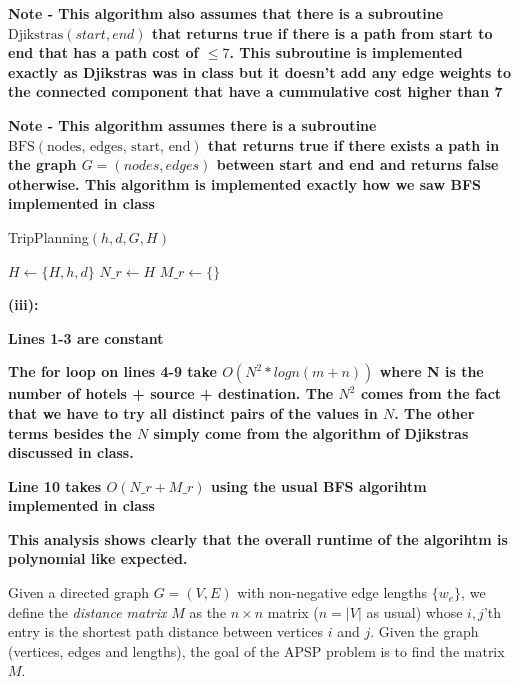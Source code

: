 \documentclass[addpoints]{exam}
\def\mysolution#1{}    %
\begin{document}
\begin{questions}
\textbf{Note - This algorithm also assumes that there is a subroutine $\text{Djikstras}(start, end)$ that returns true if there is a path from start to end that has a path cost of $\le 7$. This subroutine is implemented exactly as Djikstras was in class but it doesn't add any edge weights to the connected component that have a cummulative cost higher than 7}

\textbf{Note - This algorithm assumes there is a subroutine $\text{BFS}(\text{nodes, edges, start, end})$ that returns true if there exists a path in the graph $G=(nodes, edges)$ between start and end and returns false otherwise. This algorithm is implemented exactly how we saw BFS implemented in class}

\begin{algorithm}
\caption{TripPlanning$(h,d,G,H)$}\label{alg:cap}
\begin{algorithmic}[1]
\State $H \gets \{H,h,d\}$ 
\State $N\_r \gets H$ 
\State $M\_r \gets \{\}$  
\EndIf
\EndFor \\
\end{algorithmic}
\end{algorithm}

\textbf{(iii): }

\textbf{Lines 1-3 are constant}

\textbf{The for loop on lines 4-9 take $O(N^2 * logn(m+n))$  where N is the number of hotels + source + destination. The $N^2$ comes from the fact that we have to try all distinct pairs of the values in $N$. The other terms besides the $N$ simply come from the algorithm of Djikstras discussed in class.}

\textbf{Line 10 takes $O(N\_r + M\_r)$ using the usual BFS algorihtm implemented in class}

\textbf{This analysis shows clearly that the overall runtime of the algorihtm is polynomial like expected.}

\mysolution{

}

Given a directed graph $G = (V, E)$ with non-negative edge lengths $\{w_e\}$, we define the {\em distance matrix} $M$ as the $n \times n$ matrix ($n = |V|$ as usual) whose $i,j$'th entry is the shortest path distance between vertices $i$ and $j$. Given the graph (vertices, edges and lengths), the goal of the APSP problem is to find the matrix $M$.


\end{questions}
\end{document}
